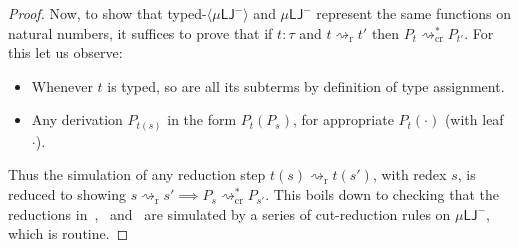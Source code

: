 \documentclass[10pt,a4paper]{amsart}
\theoremstyle{plain}
\theoremstyle{definition}
\newcommand{\anupam}[1]{\todo[color=green]{A: #1}}
\renewcommand{\todo}[1]{}
\renewcommand{\anupam}[1]{}
\theoremstyle{plain}
\theoremstyle{definition} %
\newcommand{\closure}[1]{\langle #1 \rangle}
\newcommand{\seqar}{\Rightarrow}
\newcommand{\infrule}{\mathsf{r}}
\newcommand{\rrule}{\infrule} %
\newcommand{\cut}{\mathsf{cut}}
\newcommand{\LJ}{\mathsf{LJ}}
\newcommand{\muLJ}{\mu\LJ}
\newcommand{\muLJneg}{\muLJ^-}
\newcommand{\rewrite}{\rightsquigarrow}
\newcommand{\cutreduction}{\mathrm{cr}}
\newcommand{\cutred}{\rewrite_{\cutreduction}}
\newcommand{\reduction}{\mathrm{r}}
\newcommand{\reduces}{\rewrite_{\reduction}}
\newcommand{\proves}{\vdash}
\newcommand{\der}{P}
\newcommand{\metader}{\mathcal{D}}
\begin{document}
\begin{proof}
Now, to show that  typed-$\closure \muLJneg$  and $\muLJneg$ represent the same functions on natural numbers, it suffices to prove that if $ t: \tau$  and $t \reduces t'$ then $\der_{t}\cutred^* \der_{t'}$.
% 
For this let us observe:
\begin{itemize}
    \item Whenever $t$ is typed, so are all its subterms by definition of type assignment.
    \item Any derivation $\der_{t(s)}$ in the form $\der_t(\der_s)$, for appropriate $\der_t(\cdot)$ (with leaf $\cdot$).
\end{itemize}
Thus the simulation of any reduction step $t(s) \reduces t(s')$, with redex $s$, is reduced to showing $s\reduces s' \implies \der_s \cutred^* \der_{s'}$.
% 
This boils down to checking that the reductions in~,~ and~ are simulated by a series of cut-reduction rules on $\muLJneg$, which  is routine. 
% 

\end{proof}
\end{document}

